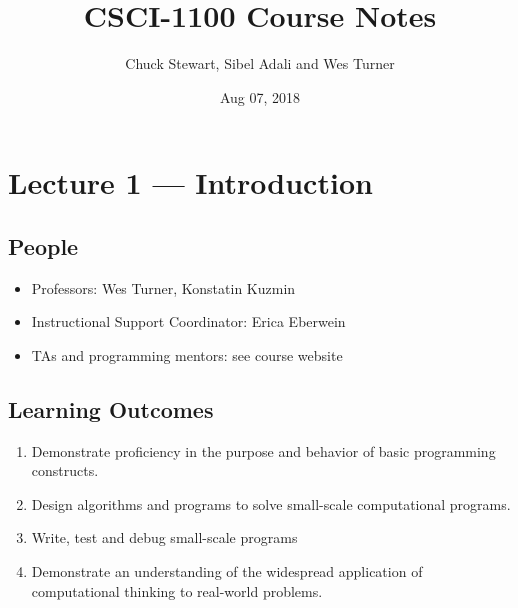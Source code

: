 \documentclass[letterpaper,10pt,english]{sphinxmanual}
\title{CSCI-1100 Course Notes}
\date{Aug 07, 2018}
\author{Chuck Stewart, Sibel Adali and Wes Turner}
\begin{document}
\maketitle
\sphinxtableofcontents
{}\label{\detokenize{lecture_notes::doc}}



\chapter{Lecture 1 — Introduction}
\label{\detokenize{lecture_notes/lec01_intro:lecture-1-introduction}}\label{\detokenize{lecture_notes/lec01_intro::doc}}

\section{People}
\label{\detokenize{lecture_notes/lec01_intro:people}}\begin{itemize}
\item {} 
Professors: Wes Turner, Konstatin Kuzmin

\item {} 
Instructional Support Coordinator: Erica Eberwein

\item {} 
TAs and programming mentors:  see course website

\end{itemize}


\section{Learning Outcomes}
\label{\detokenize{lecture_notes/lec01_intro:learning-outcomes}}\begin{enumerate}
\item {} 
Demonstrate proficiency in the purpose and behavior of basic
programming constructs.

\item {} 
Design algorithms and programs to solve small-scale computational
programs.

\item {} 
Write, test and debug small-scale programs

\item {} 
Demonstrate an understanding of the widespread application of
computational thinking to real-world problems.

\end{enumerate}
\end{document}

